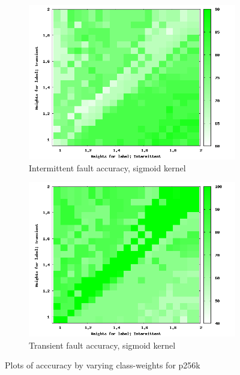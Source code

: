 \begin{figure}
        \begin{subfigure}[h]{0.45\linewidth}
                \includegraphics[scale=0.25]{figures/sig256i.png}
                \caption{Intermittent fault accuracy, sigmoid kernel}
        \end{subfigure}
			\begin{subfigure}[h]{0.45\linewidth}
                \includegraphics[scale=0.25]{figures/sig256t.png}
                \caption{Transient fault accuracy, sigmoid kernel}
        \end{subfigure}

        \caption{Plots of acccuracy by varying class-weights for p256k}
        \label{fig:sdevidance} 
\end{figure}

